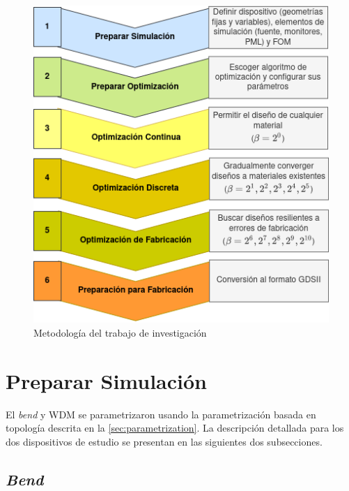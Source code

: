 \begin{figure}[ht]
  \centering
  \includegraphics[width=\textwidth]{image/proposal/pipeline.png}
  \caption{Metodología del trabajo de investigación}
  \label{fig:pipeline}
\end{figure}

\section{Preparar Simulación}

El \emph{bend} y WDM se parametrizaron usando la parametrización basada en topología descrita en la
\autoref{sec:parametrization}.
La descripción detallada para los dos dispositivos de estudio se presentan en las siguientes dos subsecciones.

\subsection{\emph{Bend}}

